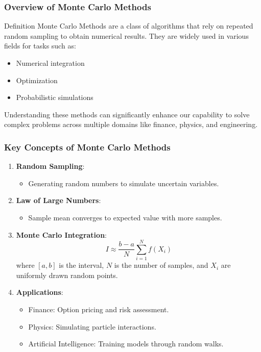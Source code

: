 \documentclass[aspectratio=169]{beamer}
\begin{document}
\begin{frame}[fragile]
    \frametitle{Overview of Monte Carlo Methods}
    \begin{block}{Definition}
        Monte Carlo Methods are a class of algorithms that rely on repeated random sampling to obtain numerical results. They are widely used in various fields for tasks such as:
    \end{block}
    \begin{itemize}
        \item Numerical integration
        \item Optimization
        \item Probabilistic simulations
    \end{itemize}
    Understanding these methods can significantly enhance our capability to solve complex problems across multiple domains like finance, physics, and engineering.
\end{frame}

\begin{frame}[fragile]
    \frametitle{Key Concepts of Monte Carlo Methods}
    \begin{enumerate}
        \item \textbf{Random Sampling}:
            \begin{itemize}
                \item Generating random numbers to simulate uncertain variables.
            \end{itemize}

        \item \textbf{Law of Large Numbers}:
            \begin{itemize}
                \item Sample mean converges to expected value with more samples.
            \end{itemize}

        \item \textbf{Monte Carlo Integration}:
            \begin{equation}
                I \approx \frac{b-a}{N} \sum_{i=1}^{N} f(X_i)
            \end{equation}
            where \( [a, b] \) is the interval, \( N \) is the number of samples, and \( X_i \) are uniformly drawn random points.

        \item \textbf{Applications}:
            \begin{itemize}
                \item Finance: Option pricing and risk assessment.
                \item Physics: Simulating particle interactions.
                \item Artificial Intelligence: Training models through random walks.
            \end{itemize}
    \end{enumerate}
\end{frame}
\end{document}
